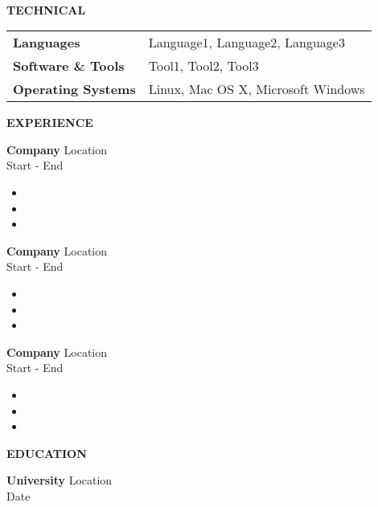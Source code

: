 \documentclass[10pt]{article}
\newcommand{\verticalspace}{\vspace{2.0mm}}
\newcommand{\horizontalrule}{\noindent\hrulefill}
\newcommand{\heading}{\noindent\Large\bf} %
\newcommand{\headingspace}{\vspace{3.5mm}}
\begin{document}
\renewcommand\familydefault{\sfdefault}




\noindent{\huge\bf \fullname}
\hfill
\additionalinfo

\vspace{-2mm}
\horizontalrule

\noindent 
\href{mailto:\email}{\email}
\hfill
\href{https://\website}{\website}
\hfill
\href{https://\linkedin}{\linkedin}
\\
\noindent \phonenumber
\hfill
\href{https://\github}{\github}

\headingspace
{\heading TECHNICAL}

\verticalspace

\begin{tabular}{@{} p{.2\linewidth} p{.75\linewidth}}

{\bf Languages} & Language1, Language2, Language3 \\

{\bf Software \& Tools} & Tool1, Tool2, Tool3 \\

{\bf Operating Systems} & Linux, Mac OS X, Microsoft Windows

\end{tabular}

{\heading EXPERIENCE}

\verticalspace

{\bf Company} \hfill Location \\
 \hfill Start - End
\begin{itemize}
\item 
\item 
\item
\end{itemize}

\verticalspace

\verticalspace

{\bf Company} \hfill Location \\
 \hfill Start - End
\begin{itemize}
\item 
\item 
\item
\end{itemize}

\verticalspace

{\bf Company} \hfill Location \\
 \hfill Start - End
\begin{itemize}
\item 
\item 
\item
\end{itemize}

\headingspace
{\heading EDUCATION}

\verticalspace

{\bf University} \hfill Location \\
 \hfill Date
\end{document}
